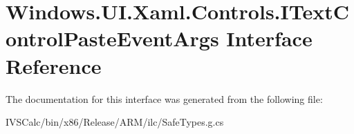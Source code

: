 \hypertarget{interface_windows_1_1_u_i_1_1_xaml_1_1_controls_1_1_i_text_control_paste_event_args}{}\section{Windows.\+U\+I.\+Xaml.\+Controls.\+I\+Text\+Control\+Paste\+Event\+Args Interface Reference}
\label{interface_windows_1_1_u_i_1_1_xaml_1_1_controls_1_1_i_text_control_paste_event_args}


The documentation for this interface was generated from the following file\+:\begin{DoxyCompactItemize}
\item 
I\+V\+S\+Calc/bin/x86/\+Release/\+A\+R\+M/ilc/Safe\+Types.\+g.\+cs\end{DoxyCompactItemize}

